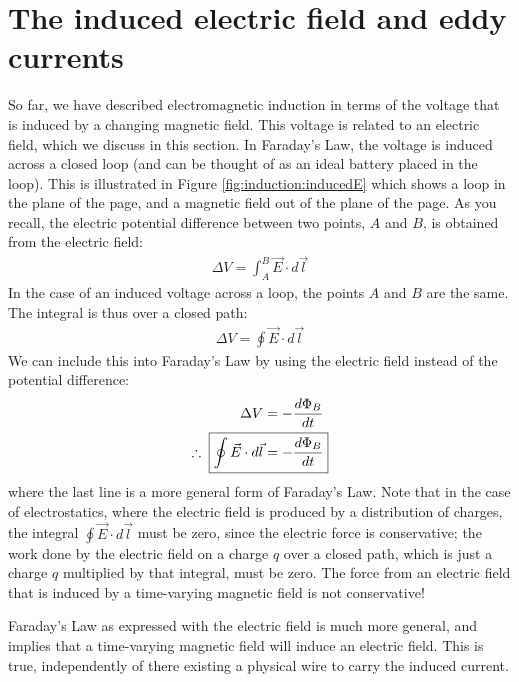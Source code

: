 \section{The induced electric field and eddy currents}
So far, we have described electromagnetic induction in terms of the voltage that is induced by a changing magnetic field. This voltage is related to an electric field, which we discuss in this section. In Faraday's  Law, the voltage is induced across a closed loop (and can be thought of as an ideal battery placed in the loop). This is illustrated in Figure \ref{fig:induction:inducedE} which shows a loop in the plane of the page, and a magnetic field out of the plane of the page.
As you recall, the electric potential difference between two points, $A$ and $B$, is obtained from the electric field:
\begin{align*}
\Delta V = \int_A^B \vec E\cdot d\vec l
\end{align*}
In the case of an induced voltage across a loop, the points $A$ and $B$ are the same. The integral is thus over a closed path:
\begin{align*}
\Delta V = \oint \vec E\cdot d\vec l
\end{align*}
We can include this into Faraday's Law by using the electric field instead of the potential difference:
\begin{align*}
\Delta V &=-\frac{d\Phi_B}{dt}\\
\therefore \;\;\Aboxed{\oint \vec E\cdot d\vec l &= -\frac{d\Phi_B}{dt}}
\end{align*}
where the last line is a more general form of Faraday's Law. Note that in the case of electrostatics, where the electric field is produced by a distribution of charges, the integral $\oint \vec E\cdot d\vec l$ must be zero, since the electric force is conservative; the work done by the electric field on a charge $q$ over a closed path, which is just a charge $q$ multiplied by that integral, must be zero. The force from an electric field that is induced by a time-varying magnetic field is not conservative!

Faraday's Law as expressed with the electric field is much more general, and implies that a time-varying magnetic field will induce an electric field. This is true, independently of there existing a physical wire to carry the induced current. 

